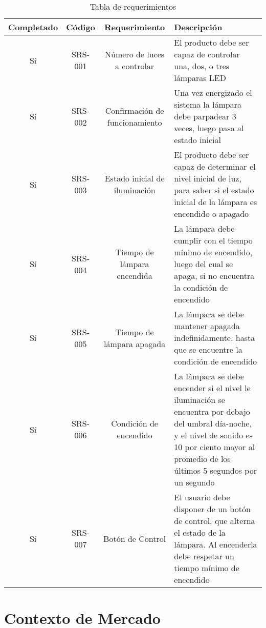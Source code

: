 \begin{table}[]
\centering
\caption{Tabla de requerimientos}
\label{tab:reg_table}
\begin{tabular}{|c|c|c|p{7cm}|}
  \hline
  Completado & Código & Requerimiento & Descripción\\
  \hline
  Sí & SRS-001 & Número de luces a controlar &El producto debe ser capaz de controlar una, dos, o
                                               tres lámparas LED\\
  \hline
  Sí & SRS-002 & Confirmación de funcionamiento & Una vez energizado el sistema la lámpara debe
                                                  parpadear 3 veces, luego pasa al estado inicial\\
  \hline
  Sí & SRS-003 & Estado inicial de iluminación & El producto debe ser capaz de determinar el nivel
                                                 inicial de luz, para saber si el estado inicial de
                                                 la lámpara es encendido o apagado \\
  \hline
  Sí & SRS-004& Tiempo de lámpara encendida & La lámpara debe cumplir con el tiempo mínimo de
                                            encendido, luego del cual se apaga, si no encuentra la
                                              condición de encendido \\
  \hline
  Sí & SRS-005& Tiempo de lámpara apagada & La lámpara se debe mantener apagada indefinidamente,
                                            hasta que se encuentre la condición de encendido\\
  \hline
  Sí & SRS-006& Condición de encendido & La lámpara se debe encender si el nivel le iluminación se
                                         encuentra por debajo del umbral día-noche, y el nivel de
                                         sonido es 10 por ciento mayor al promedio de los últimos 5
                                         segundos por un segundo\\
  \hline
  Sí & SRS-007& Botón de Control&  El usuario debe disponer de un botón de control, que alterna el
                                  estado de la lámpara. Al encenderla debe respetar un tiempo mínimo
                                  de encendido\\
  \hline
  
\end{tabular}
\end{table}


\section{Contexto de Mercado}

